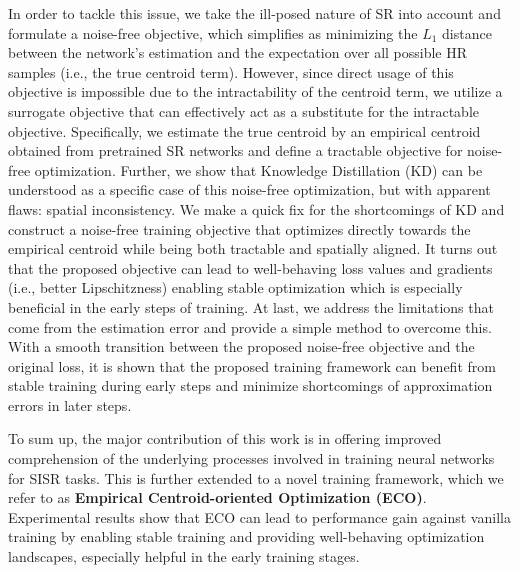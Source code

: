 \documentclass[letterpaper]{article} %
\begin{document}
In order to tackle this issue, we take the ill-posed nature of SR into account and formulate a noise-free objective, which simplifies as minimizing the $L_1$ distance between the network's estimation and the expectation over all possible HR samples (i.e., the true centroid term). However, since direct usage of this objective is impossible due to the intractability of the centroid term, we utilize a surrogate objective that can effectively act as a substitute for the intractable objective. Specifically, we estimate the true centroid by an empirical centroid obtained from pretrained SR networks and define a tractable objective for noise-free optimization. Further, we show that Knowledge Distillation (KD) can be understood as a specific case of this noise-free optimization, but with apparent flaws: spatial inconsistency. We make a quick fix for the shortcomings of KD and construct a noise-free training objective that optimizes directly towards the empirical centroid while being both tractable and spatially aligned. It turns out that the proposed objective can lead to well-behaving loss values and gradients (i.e., better Lipschitzness) enabling stable optimization which is especially beneficial in the early steps of training.  At last, we address the limitations that come from the estimation error and provide a simple method to overcome this. With a smooth transition between the proposed noise-free objective and the original loss, it is shown that the proposed training framework can benefit from stable training during early steps and minimize shortcomings of approximation errors in later steps.
 
To sum up, the major contribution of this work is in offering improved comprehension of the underlying processes involved in training neural networks for SISR tasks. This is further extended to a novel training framework, which we refer to as \textbf{Empirical Centroid-oriented Optimization (ECO)}. Experimental results show that ECO can lead to performance gain against vanilla training by enabling stable training and providing well-behaving optimization landscapes, especially helpful in the early training stages. 







\end{document}

